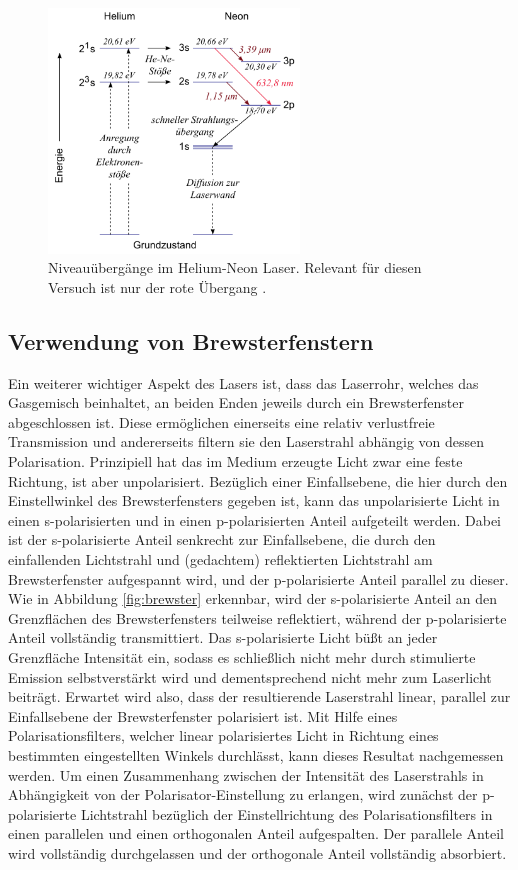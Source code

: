 \begin{figure}[H]
  \centering
  \includegraphics[height = 6.5cm]{Pics von Buddy/heneübergänge.png}
  \caption{Niveauübergänge im Helium-Neon Laser. Relevant für diesen Versuch ist nur der rote Übergang \cite{goettingen}.}
  \label{fig:HeNeÜbergänge}
\end{figure}

\subsection{Verwendung von Brewsterfenstern}

Ein weiterer wichtiger Aspekt des Lasers ist, dass das Laserrohr, welches das Gasgemisch beinhaltet,
an beiden Enden jeweils durch ein Brewsterfenster abgeschlossen ist. Diese ermöglichen einerseits
eine relativ verlustfreie Transmission und andererseits filtern sie den Laserstrahl abhängig
von dessen Polarisation. Prinzipiell hat das im Medium erzeugte Licht zwar eine feste Richtung,
ist aber unpolarisiert. Bezüglich einer Einfallsebene, die hier durch den Einstellwinkel des
Brewsterfensters gegeben ist, kann das unpolarisierte Licht in einen s-polarisierten und in einen
p-polarisierten Anteil aufgeteilt werden. Dabei ist der s-polarisierte Anteil senkrecht zur Einfallsebene, die
durch den einfallenden Lichtstrahl und (gedachtem) reflektierten Lichtstrahl am Brewsterfenster aufgespannt wird,
und der p-polarisierte Anteil parallel zu dieser. Wie in Abbildung \ref{fig:brewster} erkennbar,
wird der s-polarisierte Anteil an den Grenzflächen des Brewsterfensters teilweise reflektiert,
während der p-polarisierte Anteil vollständig transmittiert. Das s-polarisierte Licht büßt an jeder
Grenzfläche Intensität ein, sodass es schließlich nicht mehr durch stimulierte Emission selbstverstärkt
wird und dementsprechend nicht mehr zum Laserlicht beiträgt. Erwartet wird also, dass der resultierende
Laserstrahl linear, parallel zur Einfallsebene der Brewsterfenster polarisiert ist. Mit Hilfe eines
Polarisationsfilters, welcher linear polarisiertes Licht in Richtung eines bestimmten eingestellten
Winkels durchlässt, kann dieses Resultat nachgemessen werden. Um einen Zusammenhang zwischen der
Intensität des Laserstrahls in Abhängigkeit von der Polarisator-Einstellung zu erlangen, wird
zunächst der p-polarisierte Lichtstrahl bezüglich der Einstellrichtung des Polarisationsfilters in einen
parallelen und einen orthogonalen Anteil aufgespalten. Der parallele Anteil wird vollständig durchgelassen
und der orthogonale Anteil vollständig absorbiert.

